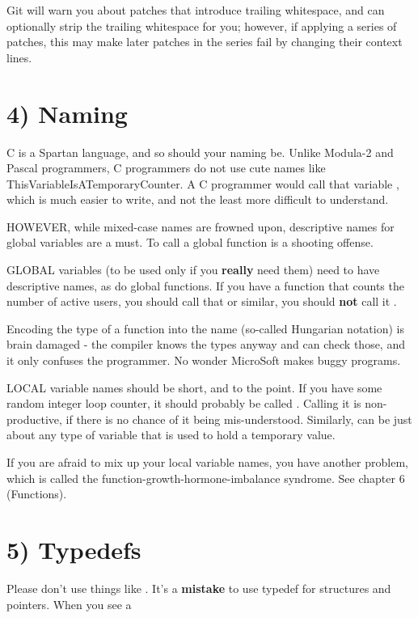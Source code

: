 \documentclass[a4paper,8pt,english]{sphinxmanual}
\begin{document}
Git will warn you about patches that introduce trailing whitespace, and can
optionally strip the trailing whitespace for you; however, if applying a series
of patches, this may make later patches in the series fail by changing their
context lines.


\section{4) Naming}
\label{process/coding-style:naming}
C is a Spartan language, and so should your naming be.  Unlike Modula-2
and Pascal programmers, C programmers do not use cute names like
ThisVariableIsATemporaryCounter.  A C programmer would call that
variable , which is much easier to write, and not the least more
difficult to understand.

HOWEVER, while mixed-case names are frowned upon, descriptive names for
global variables are a must.  To call a global function  is a
shooting offense.

GLOBAL variables (to be used only if you \textbf{really} need them) need to
have descriptive names, as do global functions.  If you have a function
that counts the number of active users, you should call that
 or similar, you should \textbf{not} call it .

Encoding the type of a function into the name (so-called Hungarian
notation) is brain damaged - the compiler knows the types anyway and can
check those, and it only confuses the programmer.  No wonder MicroSoft
makes buggy programs.

LOCAL variable names should be short, and to the point.  If you have
some random integer loop counter, it should probably be called .
Calling it  is non-productive, if there is no chance of it
being mis-understood.  Similarly,  can be just about any type of
variable that is used to hold a temporary value.

If you are afraid to mix up your local variable names, you have another
problem, which is called the function-growth-hormone-imbalance syndrome.
See chapter 6 (Functions).


\section{5) Typedefs}
\label{process/coding-style:typedefs}
Please don't use things like .
It's a \textbf{mistake} to use typedef for structures and pointers. When you see a
\end{document}
